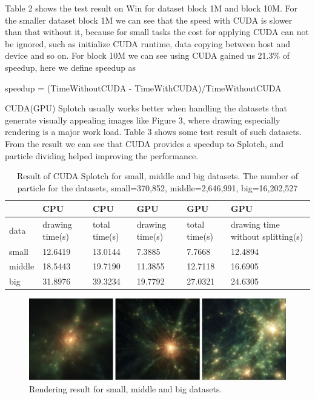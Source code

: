 Table 2 shows the test result on Win for dataset block 1M and block 10M. For the
smaller dataset block 1M we can see that the speed with CUDA is slower than that without
it, because for small tasks the cost for applying CUDA can not be ignored, 
such as initialize CUDA runtime, data copying between host and device and so on. For block
10M we can see using CUDA gained us 21.3\% of speedup, here we define speedup as

speedup = (TimeWithoutCUDA - TimeWithCUDA)/TimeWithoutCUDA

CUDA(GPU) Splotch usually works better when handling the datasets
that generate visually appealing images like Figure 3, where drawing especially rendering
is a major work load. Table 3 shows some test result of such datasets. 
From the result we can see that CUDA provides a speedup to Splotch, and 
particle dividing helped improving the performance.


\begin{table}
\caption{Result of CUDA Splotch for small, middle and big datasets. The number of particle for the 
datasets, small=370,852, middle=2,646,991, big=16,202,527}
\begin{center}
\begin{tabular}{ | l || l | l || l | l | p{2cm} |}
\hline  
   &	CPU	& CPU	& GPU	& GPU	& GPU \\
\hline
  data & drawing time(s) & total time(s) & drawing time(s) & total time(s) & drawing time without splitting(s) \\
\hline  
  small &	12.6419	& 13.0144	& 7.3885	& 7.7668	& 12.4894 \\
\hline
  middle &	18.5443 &	19.7190 &	11.3855 &	12.7118 &	16.6905 \\
\hline
  big	& 31.8976 &	39.3234 &	19.7792 &	27.0321	& 24.6305\\
\hline
\end{tabular}
\end{center}
\end{table}

\begin{figure}
\begin{center}
\includegraphics[width=1.0\textwidth]{cu_images.png}
\end{center}
\caption{Rendering result for small, middle and big datasets.}
\end{figure}


